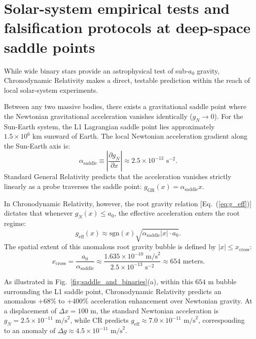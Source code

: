 \documentclass[aps,prd,reprint,superscriptaddress,nofootinbib,floatfix,amsmath,amssymb]{revtex4-2}
\begin{document}
\section{Solar-system empirical tests and falsification protocols at deep-space saddle points}
\label{sec:saddle_point}

While wide binary stars provide an astrophysical test of sub-$a_0$ gravity, Chronodynamic Relativity makes a direct, testable prediction within the reach of local solar-system experiments. 

Between any two massive bodies, there exists a gravitational saddle point where the Newtonian gravitational acceleration vanishes identically ($g_N \to 0$). For the Sun-Earth system, the L1 Lagrangian saddle point lies approximately $1.5 \times 10^6\text{ km}$ sunward of Earth. The local Newtonian acceleration gradient along the Sun-Earth axis is:
\begin{equation}
\alpha_{\text{saddle}} \equiv \left| \frac{\partial g_N}{\partial x} \right| \approx 2.5 \times 10^{-13}\text{ s}^{-2}.
\end{equation}
Standard General Relativity predicts that the acceleration vanishes strictly linearly as a probe traverses the saddle point: $g_{\text{GR}}(x) = \alpha_{\text{saddle}} x$.

In Chronodynamic Relativity, however, the root gravity relation [Eq.~(\ref{eq:g_eff})] dictates that whenever $g_N(x) \le a_0$, the effective acceleration enters the root regime:
\begin{equation}
g_{\text{eff}}(x) \approx \text{sgn}(x) \sqrt{\alpha_{\text{saddle}} |x| \cdot a_0}.
\end{equation}
The spatial extent of this anomalous root gravity bubble is defined by $|x| \le x_{\text{cross}}$:
\begin{equation}
x_{\text{cross}} = \frac{a_0}{\alpha_{\text{saddle}}} \approx \frac{1.635 \times 10^{-10}\text{ m/s}^2}{2.5 \times 10^{-13}\text{ s}^{-2}} \approx 654\text{ meters}.
\end{equation}

As illustrated in Fig.~\ref{fig:saddle_and_binaries}(a), within this $654\text{ m}$ bubble surrounding the L1 saddle point, Chronodynamic Relativity predicts an anomalous $+68\%$ to $+400\%$ acceleration enhancement over Newtonian gravity. At a displacement of $\Delta x = 100\text{ m}$, the standard Newtonian acceleration is $g_N = 2.5 \times 10^{-11}\text{ m/s}^2$, while CR predicts $g_{\text{eff}} \approx 7.0 \times 10^{-11}\text{ m/s}^2$, corresponding to an anomaly of $\Delta g \approx 4.5 \times 10^{-11}\text{ m/s}^2$. 
\end{document}
